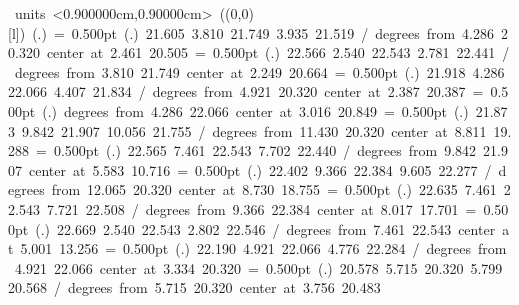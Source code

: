 \documentclass[10pt]{article}
\begin{document}
\mbox{\beginpicture
\setcoordinatesystem units <0.900000cm,0.90000cm>
\unitlength=1.00000cm
\linethickness=1pt
\setplotsymbol ({\makebox(0,0)[l]{\tencirc{}}})
\setshadesymbol ({\thinlinefont .})
\setlinear
%
%
\linethickness= 0.500pt
\setplotsymbol ({\thinlinefont .})
%
%
 21.605  3.810 21.749  3.935 21.519 /
%
 degrees from  4.286 20.320 center at  2.461 20.505
%
%
\linethickness= 0.500pt
\setplotsymbol ({\thinlinefont .})
%
%
 22.566  2.540 22.543  2.781 22.441 /
%
 degrees from  3.810 21.749 center at  2.249 20.664
%
%
\linethickness= 0.500pt
\setplotsymbol ({\thinlinefont .})
%
%
 21.918  4.286 22.066  4.407 21.834 /
%
 degrees from  4.921 20.320 center at  2.387 20.387
%
%
\linethickness= 0.500pt
\setplotsymbol ({\thinlinefont .})
 degrees from  4.286 22.066 center at  3.016 20.849
%
%
\linethickness= 0.500pt
\setplotsymbol ({\thinlinefont .})
%
%
 21.873  9.842 21.907 10.056 21.755 /
%
 degrees from 11.430 20.320 center at  8.811 19.288
%
%
\linethickness= 0.500pt
\setplotsymbol ({\thinlinefont .})
%
%
 22.565  7.461 22.543  7.702 22.440 /
%
 degrees from  9.842 21.907 center at  5.583 10.716
%
%
\linethickness= 0.500pt
\setplotsymbol ({\thinlinefont .})
%
%
 22.402  9.366 22.384  9.605 22.277 /
%
 degrees from 12.065 20.320 center at  8.730 18.755
%
%
\linethickness= 0.500pt
\setplotsymbol ({\thinlinefont .})
%
%
 22.635  7.461 22.543  7.721 22.508 /
%
 degrees from  9.366 22.384 center at  8.017 17.701
%
%
\linethickness= 0.500pt
\setplotsymbol ({\thinlinefont .})
%
%
 22.669  2.540 22.543  2.802 22.546 /
%
 degrees from  7.461 22.543 center at  5.001 13.256
%
%
\linethickness= 0.500pt
\setplotsymbol ({\thinlinefont .})
%
%
 22.190  4.921 22.066  4.776 22.284 /
%
 degrees from  4.921 22.066 center at  3.334 20.320
%
%
\linethickness= 0.500pt
\setplotsymbol ({\thinlinefont .})
%
%
 20.578  5.715 20.320  5.799 20.568 /
%
 degrees from  5.715 20.320 center at  3.756 20.483
}
\end{document}

